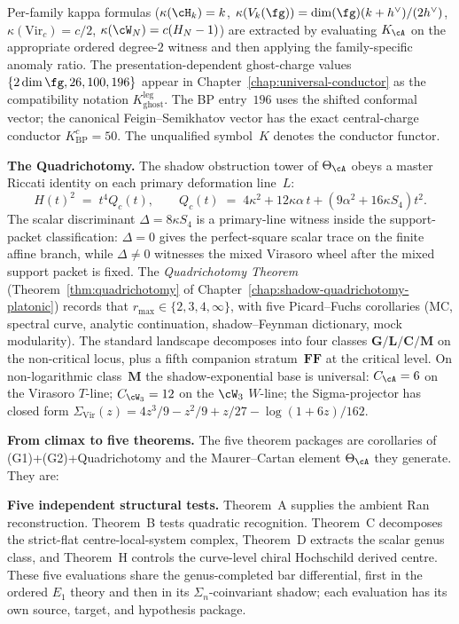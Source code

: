 Per-family kappa formulas
($\kappa(\cH_k)=k$, $\kappa(V_k(\fg))=\dim(\fg)(k+h^{\vee})/(2h^{\vee})$,
$\kappa(\mathrm{Vir}_c)=c/2$, $\kappa(\cW_N)=c(H_N-1)$) are extracted
by evaluating $K_\cA$ on the appropriate ordered degree-$2$
witness and then applying the family-specific anomaly ratio.  The
presentation-dependent ghost-charge values
$\{2\dim\fg,26,100,196\}$ appear in
Chapter~\ref{chap:universal-conductor} as the compatibility notation
$K_{\mathrm{ghost}}^{\mathrm{leg}}$.  The BP entry~$196$ uses the
shifted conformal vector; the canonical Feigin--Semikhatov vector has
the exact central-charge conductor $K^c_{\mathrm{BP}}=50$.  The
unqualified symbol~$K$ denotes the conductor functor.

\medskip\noindent\textbf{The Quadrichotomy.}
The shadow obstruction tower of $\Theta_\cA$ obeys a master Riccati
identity on each primary deformation line~$L$:
\[
H(t)^{2}\;=\;t^{4}Q_{c}(t),
\qquad
Q_{c}(t)\;=\;4\kappa^{2}+12\kappa\alpha\, t+(9\alpha^{2}+16\kappa S_4)t^{2}.
\]
The scalar discriminant $\Delta=8\kappa S_4$ is a primary-line witness
inside the support-packet classification: $\Delta=0$ gives the
perfect-square scalar trace on the finite affine branch, while
\(\Delta\ne0\) witnesses the mixed Virasoro wheel after the mixed
support packet is fixed. The
\emph{Quadrichotomy Theorem} (Theorem~\ref{thm:quadrichotomy} of
Chapter~\ref{chap:shadow-quadrichotomy-platonic}) records that
$r_{\max}\in\{2,3,4,\infty\}$, with five Picard--Fuchs corollaries (MC,
spectral curve, analytic continuation, shadow--Feynman dictionary, mock
modularity). The standard landscape decomposes into four classes
$\mathbf{G}/\mathbf{L}/\mathbf{C}/\mathbf{M}$ on the non-critical locus,
plus a fifth companion stratum~$\mathbf{FF}$ at the critical level.
On non-logarithmic class~$\mathbf{M}$ the shadow-exponential base is
universal: $C_\cA=6$ on the Virasoro $T$-line; $C_{\cW_3}=12$ on the
$\cW_3$ $W$-line; the Sigma-projector has closed form
$\Sigma_{\mathrm{Vir}}(z)=4z^3/9-z^2/9+z/27-\log(1+6z)/162$.

\medskip\noindent\textbf{From climax to five theorems.}
The five theorem packages are corollaries of (G1)+(G2)+Quadrichotomy and the
Maurer--Cartan element $\Theta_\cA$ they generate. They are:

\medskip\noindent\textbf{Five independent structural tests.}
Theorem~A supplies the ambient Ran reconstruction.  Theorem~B tests
quadratic recognition.  Theorem~C decomposes the strict-flat
centre-local-system complex, Theorem~D extracts the scalar genus class,
and Theorem~H controls the curve-level chiral Hochschild derived centre.
These five evaluations share the genus-completed bar
differential, first in the ordered $E_1$ theory and then in its
$\Sigma_n$-coinvariant shadow; each evaluation has its own source,
target, and hypothesis package.

